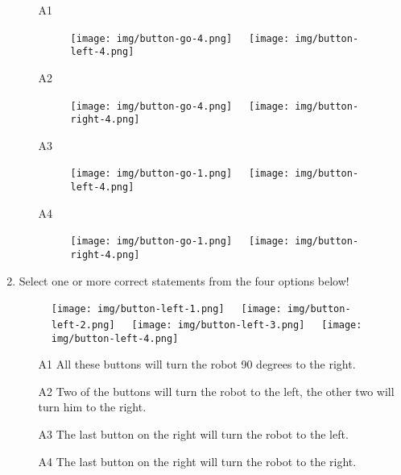 \begin{enumerate}
\begin{enumerate}
\item[A1] 
\begin{figure}[!ht]
\begin{center}
\texttt{[image: img/button-go-4.png]}\ \ \
\texttt{[image: img/button-left-4.png]}
\end{center}
\end{figure}
\item[A2] 
\begin{figure}[!ht]
\begin{center}
\texttt{[image: img/button-go-4.png]}\ \ \
\texttt{[image: img/button-right-4.png]}
\end{center}
\end{figure}
\newpage
\item[A3] 
\begin{figure}[!ht]
\begin{center}
\texttt{[image: img/button-go-1.png]}\ \ \
\texttt{[image: img/button-left-4.png]}
\end{center}
\end{figure}
\item[A4] 
\begin{figure}[!ht]
\begin{center}
\texttt{[image: img/button-go-1.png]}\ \ \
\texttt{[image: img/button-right-4.png]}
\end{center}
\end{figure}
\end{enumerate}
\item Select one or more correct statements from the four options below!

\begin{figure}[!ht]
\begin{center}
\texttt{[image: img/button-left-1.png]}\ \ \
\texttt{[image: img/button-left-2.png]}\ \ \
\texttt{[image: img/button-left-3.png]}\ \ \
\texttt{[image: img/button-left-4.png]}
\end{center}
\end{figure}
\begin{enumerate}
\item[A1] All these buttons will turn the robot 90 degrees to the right.
\item[A2] Two of the buttons will turn the robot to the left, the other 
          two will turn him to the right.
\item[A3] The last button on the right will turn the robot to the left.
\item[A4] The last button on the right will turn the robot to the right.
\end{enumerate}


\end{enumerate}
